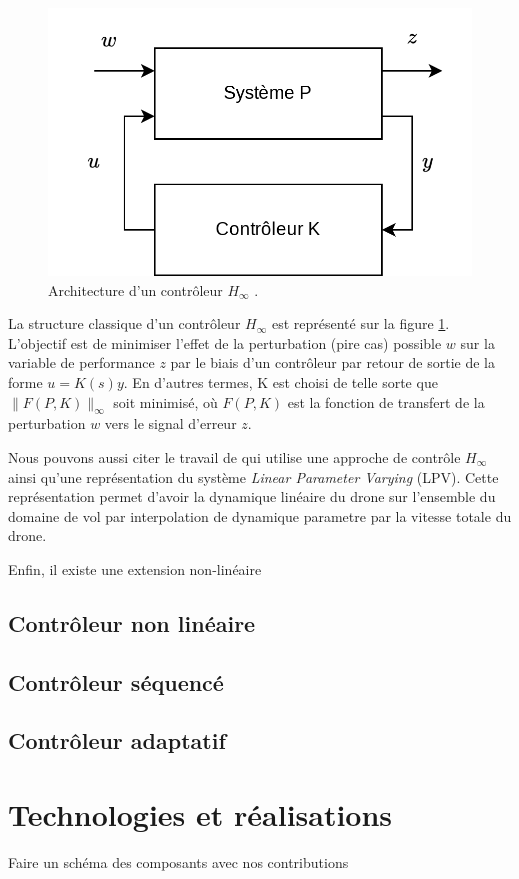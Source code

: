 \begin{figure}[ht!]
    \centerline{
    \includegraphics[trim=0cm 0cm 0cm 0cm,clip,width=0.5\columnwidth]{figures/lft.png}}
    \caption{Architecture d'un contrôleur $H_{\infty}$ .}
    \label{fig:schemalft}
\end{figure}

La structure classique d'un contrôleur $H_{\infty}$ est représenté sur la figure \ref{fig:schemalft}. L'objectif est de minimiser l'effet de la perturbation (pire cas) possible $w$ sur la variable de performance $z$ par le biais d'un contrôleur par retour de sortie de la forme $u = K(s) y$. En d'autres termes, K est choisi de telle sorte que $\| F(P, K)\|_{\infty}$  soit minimisé, où $F(P, K)$ est la fonction de transfert de la perturbation $w$ vers le signal d'erreur $z$. 

Nous pouvons aussi citer le travail de \cite{SNYDER2021106621} qui utilise une approche de contrôle $H_{\infty}$ ainsi qu'une représentation du système \textit{Linear Parameter Varying} (LPV). Cette représentation permet d'avoir la dynamique linéaire du drone sur l'ensemble du domaine de vol par interpolation de dynamique parametre par la vitesse totale du drone.

Enfin, il existe une extension non-linéaire \cite{CardosoEsteban2019}
\subsection*{Contrôleur non linéaire}

\subsection*{Contrôleur séquencé}

\subsection*{Contrôleur adaptatif}

\section{Technologies et réalisations}
Faire un schéma des composants avec nos contributions

